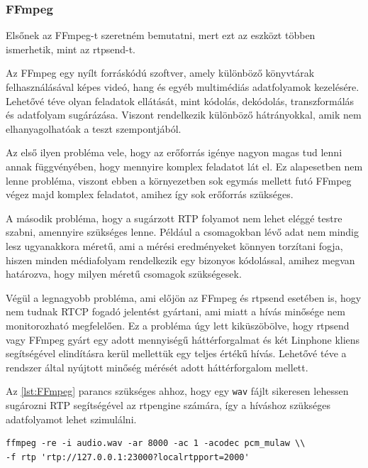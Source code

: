 \subsubsection{FFmpeg}

Elsőnek az FFmpeg-t szeretném bemutatni, mert ezt az eszközt többen ismerhetik,
mint az rtpsend-t. 

Az FFmpeg \cite{ffmpeg} egy nyílt forráskódú szoftver, amely különböző könyvtárak 
felhasználásával képes videó, hang és egyéb multimédiás adatfolyamok kezelésére. Lehetővé 
téve olyan feladatok ellátását, mint kódolás, dekódolás, transzformálás és adatfolyam 
sugárázása. Viszont rendelkezik különböző hátrányokkal, amik nem elhanyagolhatóak a teszt 
szempontjából.

Az első ilyen probléma vele, hogy az erőforrás igénye nagyon magas tud lenni 
annak függvényében, hogy mennyire komplex feladatot lát el. Ez alapesetben nem lenne
probléma, viszont ebben a környezetben sok egymás mellett futó FFmpeg végez majd
komplex feladatot, amihez így sok erőforrás szükséges.

A második probléma, hogy a sugárzott RTP folyamot nem lehet eléggé testre szabni, 
amennyire szükséges lenne. Például a csomagokban lévő adat nem mindig lesz 
ugyanakkora méretű, ami a mérési eredményeket könnyen torzítani fogja, hiszen 
minden médiafolyam rendelkezik egy bizonyos kódolással, amihez megvan határozva, hogy
milyen méretű csomagok szükségesek.

Végül a legnagyobb probléma, ami előjön az FFmpeg és rtpsend esetében is, hogy nem
tudnak RTCP fogadó jelentést gyártani, ami miatt a hívás minősége nem monitorozható 
megfelelően. Ez a probléma úgy lett kiküszöbölve, hogy rtpsend vagy FFmpeg gyárt
egy adott mennyiségű háttérforgalmat és két Linphone kliens segítségével elindításra 
kerül mellettük egy teljes értékű hívás.  Lehetővé téve a rendszer által nyújtott minőség 
mérését adott háttérforgalom mellett. 

Az \ref{lst:FFmpeg} parancs szükséges ahhoz, hogy egy \texttt{wav} fájlt sikeresen 
lehessen sugározni RTP segítségével az rtpengine számára, így a híváshoz szükséges 
adatfolyamot lehet szimulálni. 

\begin{lstlisting}[caption=FFmpeg RTP folyam indtása, label=lst:FFmpeg]
ffmpeg -re -i audio.wav -ar 8000 -ac 1 -acodec pcm_mulaw \\
-f rtp 'rtp://127.0.0.1:23000?localrtpport=2000'
\end{lstlisting}

